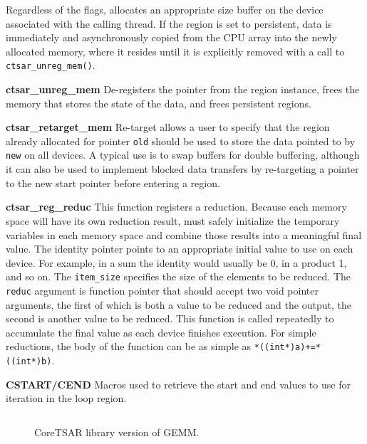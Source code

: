 Regardless of the flags, \tsar allocates an appropriate size buffer on the
device associated with the calling thread. If the region is set to persistent,
data is immediately and asynchronously copied from the CPU array into the newly
allocated memory, where it resides until it is explicitly removed with a call to
\verb#ctsar_unreg_mem()#.

\textbf{ctsar\_unreg\_mem} De-registers the pointer from the region instance,
frees the memory that stores the state of the data, and frees persistent
regions.

\textbf{ctsar\_retarget\_mem} Re-target allows a user to specify that the
region already allocated for pointer \verb#old# should be used to store the
data pointed to by \verb#new# on all devices.  A typical use is to swap
buffers for double buffering, although it can also be used to implement
blocked data transfers by re-targeting a pointer to the new start pointer
before entering a region.

\textbf{ctsar\_reg\_reduc} This function registers a reduction. Because each
memory space will have its own reduction result, \tsar must safely initialize
the temporary variables in each memory space and combine those results into a
meaningful final value. The identity pointer points to an appropriate initial
value to use on each device. For example, in a sum the identity would usually
be 0, in a product 1, and so on.  The \verb#item_size# specifies the size of
the elements to be reduced.  The \verb#reduc# argument is function pointer
that should accept two void pointer arguments, the first of which is both a
value to be reduced and the output, the second is another value to be reduced.
This function is called repeatedly to accumulate the final value as each
device finishes execution.  For simple reductions, the body of the function
can be as simple as \verb#*((int*)a)+=*((int*)b)#.

\textbf{CSTART/CEND} Macros used to retrieve the start and end values to use
for iteration in the loop region.





\begin{figure}[t]
    \begin{center}
        \ifm
        \inputminted[fontsize=\scriptsize,frame=single]{c}{snippets/manual.c}
        \else
        
        \fi

    \end{center}
    \caption{CoreTSAR library version of GEMM.\label{fig:k-means-split}}
\end{figure}

